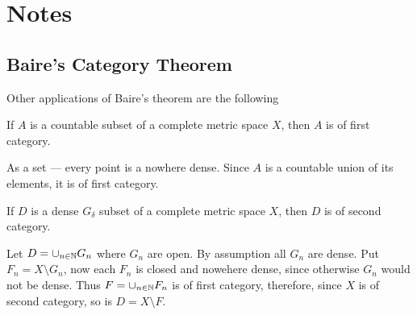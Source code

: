 


\section{Notes}

\subsection{Baire's Category Theorem}

Other applications of Baire's theorem are the following

\begin{llem} \label{lem:count:1cat}
If $A$ is a countable subset of a complete metric space $X$,
then $A$ is of first category.
\end{llem}

\begin{thmproof}
As a set --- every point is a nowhere dense. 
Since  $A$ is a countable union of its elements, it is of first category.
\end{thmproof}

\begin{llem} \label{lem:gdel:2cat}
If $D$ is a dense \(G_\delta\) subset of a complete metric space $X$,
then $D$ is of second category.
\end{llem}

\begin{thmproof}
Let \(D=\cup_{n\in\mathbb{N}}G_n\) where \(G_n\) are open. By assumption
all \(G_n\) are dense. Put \(F_n = X \setminus G_n\), now each \(F_n\) is
closed and nowehere dense, since otherwise \(G_n\) would not be dense.
Thus \(F = \cup_{n\in\mathbb{N}}F_n\) is of first category, 
therefore, since $X$ is of second category, 
so is \(D = X \setminus F\).
\end{thmproof}



